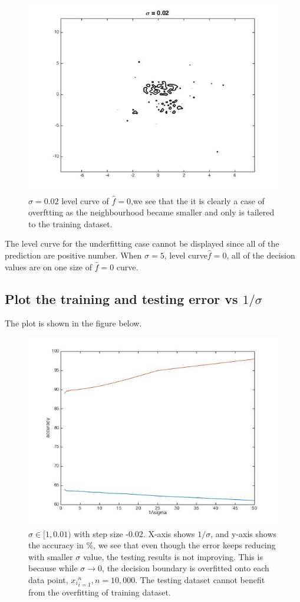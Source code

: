 \documentclass[twoside]{article}
\theoremstyle{definition}
\theoremstyle{definition}
\theoremstyle{remark}
\newcommand{\percent}{$\%$}
\begin{document}
\begin{figure}[H]
\centering
\includegraphics[width=120mm]{sigma_002_lc.jpg}
\caption{ $\sigma = 0.02$ level curve of $\hat f = 0$,we see that the it is clearly a case of overftting as the neighbourhood became smaller and only is tailered to the training dataset. \label{problem2Pic6}}
\end{figure}

The level curve for the underfitting case cannot be displayed since all of the prediction are positive number. When $\sigma = 5$, level curve$\hat f = 0$, all of the decision values are on one size of $\hat f = 0$ curve.

\subsection{Plot the training and testing error vs $1/\sigma$}
The plot is shown in the figure below.
\begin{figure}[H]
\centering
\includegraphics[width=120mm]{training_testing_err.jpg}
\caption{ $\sigma \in [1,0.01)$ with step size -0.02. X-axis shows $1/\sigma$, and y-axis shows the accuracy in \percent, we see that even though the error keeps reducing with smaller $\sigma$ value, the testing results is not improving. This is because while $\sigma \rightarrow 0$, the decision boundary is overfitted onto each data point, ${x_i}_{i=1}^n, n = 10,000$. The testing dataset cannot benefit from the overfitting of training dataset.} 
\end{figure}
\end{document}
